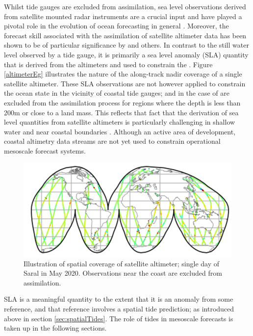 Whilst tide gauges are excluded from assimilation, sea level observations derived from satellite mounted radar instruments are a crucial input and have played a pivotal role in the evolution of ocean forecasting in general \citep{Fu:2001ub}.  Moreover, the forecast skill associated with the assimilation of satellite altimeter data has been shown to be of particular significance by  \cite{10.5194/os-13-1077-2017} and others.
In contrast to the still water level observed by a tide gauge, it is primarily a sea level anomaly (SLA) quantity that is derived from the altimeters and used to constrain the \OGCM{}. Figure \ref{altimeterEg} illustrates the nature of the along-track nadir coverage of a single satellite altimeter.
These SLA observations are not however applied to constrain the ocean state in the vicinity of coastal tide gauges; and in the case of \BL{} are excluded from the assimilation process for regions where the depth is less than 200m or close to a land mass.   This reflects that fact that the derivation of sea level quantities from satellite altimeters is particularly challenging in shallow water and near coastal boundaries \citep{Woodworth:2011bf}.    Although an active area of development, coastal altimetry data streams are not yet used to constrain operational mesoscale forecast  systems.
\begin{figure}[h]\centering
  \includegraphics[width=\figwidthHalf]{figures/maps/altimeterCoverageEg.png}
  \caption{Illustration of spatial coverage of satellite altimeter; single day of Saral in May 2020. Observations near the coast are excluded from assimilation.}
  \label{fig:altimeterEg}
\end{figure}
SLA is a meaningful quantity to the extent that it is an anomaly from some reference, and that reference involves a spatial tide prediction; as introduced above in section \ref{sec:spatialTides}.
The role of tides in mesoscale forecasts is taken up in the following sections.
